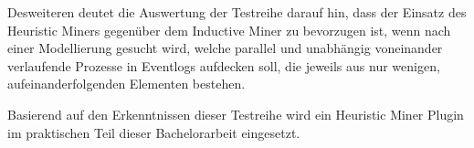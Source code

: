\begin{table}[!htbp]
\centering
{}
\caption{Zusammenfassung der Auswertung der Versuchreihe}
\label{tab:results_short}
\end{table}

Desweiteren deutet die Auswertung der Testreihe darauf hin, dass der Einsatz des Heuristic Miners gegenüber dem Inductive Miner zu bevorzugen ist, wenn nach einer Modellierung gesucht wird, welche parallel und unabhängig voneinander verlaufende Prozesse in Eventlogs aufdecken soll, die jeweils aus nur wenigen, aufeinanderfolgenden Elementen bestehen.

Basierend auf den Erkenntnissen dieser Testreihe wird ein Heuristic Miner Plugin im praktischen Teil dieser Bachelorarbeit eingesetzt.




